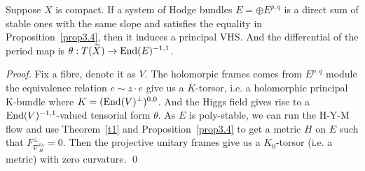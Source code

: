 \documentclass[aspectratio=169, 10pt]{beamer}
\theoremstyle{definition}
\theoremstyle{example}
\begin{document}
	\begin{frame}
		\begin{lemma}\label{projectivevariation}
			Suppose $X$ is compact. If a system of Hodge bundles $E=\oplus E^{p,q}$ is a direct sum of stable ones with the same slope and satisfies the equality in Proposition~\ref{prop3.4}, then it induces a principal VHS. And the differential of the period map is $\theta: T(\widetilde{X})\to \operatorname{End}(E)^{-1,1}$.
		\end{lemma}
		\noindent \textit{Proof.}
		Fix a fibre, denote it as $V$. The holomorpic frames comes from $E^{p,q}$ module the equivalence relation $e\sim z\cdot e$ give us a $K$-torsor, i.e. a holomorphic principal K-bundle where $K=(\operatorname{End}(V)^{\perp})^{0,0}$. And the Higgs field gives rise to a $\operatorname{End}(V)^{-1,1}$-valued tensorial form $\theta$. As $E$ is poly-stable, we can run the H-Y-M flow and use Theorem~\ref{t1} and Proposition~\ref{prop3.4} to get a metric $H$ on $E$ such that $F^{\perp}_{\nabla^{hs}_H}=0$. Then the projective unitary frames give us a $K_0$-torsor (i.e. a metric) with zero curvature. \hfill \qed
	\end{frame}
\end{document}
